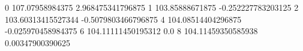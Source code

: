 0 107.07958984375 2.968475341796875
1 103.85888671875 -0.252227783203125
2 103.60313415527344 -0.5079803466796875
4 104.08514404296875 -0.025970458984375
6 104.11111450195312 0.0
8 104.11459350585938 0.00347900390625
